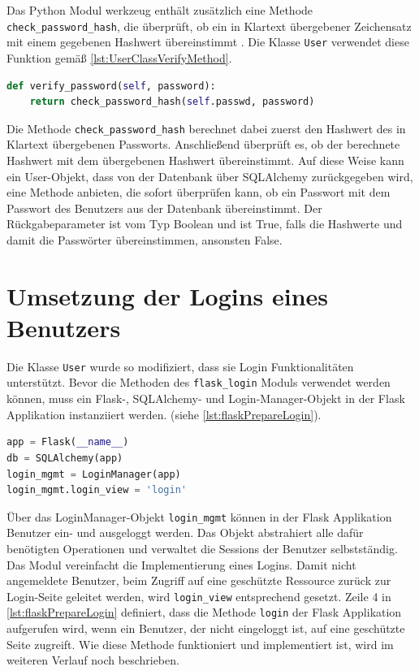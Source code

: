 \documentclass[a4paper,titlepage,halfparskip,12pt]{scrreprt}
\begin{document}
\begin{onehalfspacing}
Das Python Modul werkzeug enthält zusätzlich eine Methode \texttt{check\_password\_hash}, die überprüft, ob ein in Klartext übergebener Zeichensatz mit einem gegebenen Hashwert übereinstimmt \cite{werkzeugDoc}. Die Klasse \texttt{User} verwendet diese Funktion gemäß \autoref{lst:UserClassVerifyMethod}.

\bigskip

\begin{lstlisting}[language=python, caption={Methode zur Überprüfung auf Übereinstimmung eines Zeichensatzes mit einem übergebenen Hashwert}, label={lst:UserClassVerifyMethod}]
def verify_password(self, password):
    return check_password_hash(self.passwd, password)
\end{lstlisting}

Die Methode \texttt{check\_password\_hash} berechnet dabei zuerst den Hashwert des in Klartext übergebenen Passworts. Anschließend überprüft es, ob der berechnete Hashwert mit dem übergebenen Hashwert übereinstimmt. Auf diese Weise kann ein User-Objekt, dass von der Datenbank über SQLAlchemy zurückgegeben wird, eine Methode anbieten, die sofort überprüfen kann, ob ein Passwort mit dem Passwort des Benutzers aus der Datenbank übereinstimmt. Der Rückgabeparameter ist vom Typ Boolean und ist True, falls die Hashwerte und damit die Passwörter übereinstimmen, ansonsten False.

\section{Umsetzung der Logins eines Benutzers}

Die Klasse \texttt{User} wurde so modifiziert, dass sie Login Funktionalitäten unterstützt. Bevor die Methoden des \texttt{flask\_login} Moduls verwendet werden können, muss ein Flask-, SQLAlchemy- und Login-Manager-Objekt in der Flask Applikation instanziiert werden. (siehe \autoref{lst:flaskPrepareLogin}).

\begin{lstlisting}[language=python, caption={Vorbereitungen der Login Funktionalität in der Flask Applikation}, label={lst:flaskPrepareLogin}]
app = Flask(__name__)
db = SQLAlchemy(app)
login_mgmt = LoginManager(app)
login_mgmt.login_view = 'login'
\end{lstlisting}

Über das LoginManager-Objekt \texttt{login\_mgmt} können in der Flask Applikation Benutzer ein- und ausgeloggt werden. Das Objekt abstrahiert alle dafür benötigten Operationen und verwaltet die Sessions der Benutzer selbstständig. Das Modul vereinfacht die Implementierung eines Logins. Damit nicht angemeldete Benutzer, beim Zugriff auf eine geschützte Ressource zurück zur Login-Seite geleitet werden, wird \texttt{login\_view} entsprechend gesetzt. Zeile 4 in \autoref{lst:flaskPrepareLogin} definiert, dass die Methode \texttt{login} der Flask Applikation aufgerufen wird, wenn ein Benutzer, der nicht eingeloggt ist, auf eine geschützte Seite zugreift. Wie diese Methode funktioniert und implementiert ist, wird im weiteren Verlauf noch beschrieben.\cite{flaskLogin}


\end{onehalfspacing}
\end{document}
